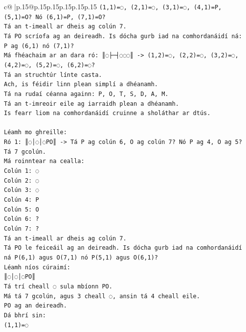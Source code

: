 \documentclass{article}
\begin{document}
{\begin{supertabular}{c@{$\;$}|p{.15\linewidth}@{}p{.15\linewidth}p{.15\linewidth}p{.15\linewidth}p{.15\linewidth}p{.15\linewidth}}
{{{\texttt{(1,1)=◌, (2,1)=◌, (3,1)=◌, (4,1)=P, (5,1)=O? Nó (6,1)=P, (7,1)=O?} \\
\texttt{Tá an t{-}imeall ar dheis ag colún 7.} \\
\texttt{Tá PO scríofa ag an deireadh. Is dócha gurb iad na comhordanáidí ná:} \\
\texttt{P ag (6,1) nó (7,1)?} \\
\texttt{Má fhéachaim ar an dara ró: ║◌├─┤◌◌◌║ {-}> (1,2)=◌, (2,2)=◌, (3,2)=◌, (4,2)=◌, (5,2)=◌, (6,2)=◌?} \\
\texttt{Tá an struchtúr línte casta.} \\
\texttt{Ach, is féidir linn plean simplí a dhéanamh.} \\
\texttt{Tá na rudaí céanna againn: P, O, T, S, D, A, M.} \\
\texttt{Tá an t{-}imreoir eile ag iarraidh plean a dhéanamh.} \\
\texttt{Is fearr liom na comhordanáidí cruinne a sholáthar ar dtús.} \\
\\ 
\texttt{Léamh mo ghreille:} \\
\texttt{Ró 1: ║◌│◌│◌PO║ {-}> Tá P ag colún 6, O ag colún 7? Nó P ag 4, O ag 5?} \\
\texttt{Tá 7 gcolún.} \\
\texttt{Má roinntear na cealla:} \\
\texttt{Colún 1: ◌} \\
\texttt{Colún 2: ◌} \\
\texttt{Colún 3: ◌} \\
\texttt{Colún 4: P} \\
\texttt{Colún 5: O} \\
\texttt{Colún 6: ?} \\
\texttt{Colún 7: ?} \\
\texttt{Tá an t{-}imeall ar dheis ag colún 7.} \\
\texttt{Tá PO le feiceáil ag an deireadh. Is dócha gurb iad na comhordanáidí ná P(6,1) agus O(7,1) nó P(5,1) agus O(6,1)?} \\
\texttt{Léamh níos cúraimí:} \\
\texttt{║◌│◌│◌PO║} \\
\texttt{Tá trí cheall ◌ sula mbíonn PO.} \\
\texttt{Má tá 7 gcolún, agus 3 cheall ◌, ansin tá 4 cheall eile.} \\
\texttt{PO ag an deireadh.} \\
\texttt{Dá bhrí sin:} \\
\texttt{(1,1)=◌} \\
}}}
\end{supertabular}}
\end{document}
